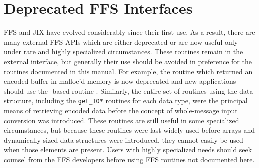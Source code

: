\section{Deprecated FFS Interfaces}
FFS and JIX have evolved considerably since their first use.  As a result,
there are many external FFS APIs which are either deprecated or are now
useful only under rare and highly specialized circumstances.  These routines
remain in the external interface, but generally their use should be avoided
in preference for the routines documented in this manual.  For example, the
routine  which returned an
encoded buffer in malloc'd memory is now deprecated and new applications
should use the -based routine
.  Similarly, the entire set of routines
using the  data structure, including the {\tt get\_IO*}
routines for each data type, were the principal means of retrieving encoded
data before the concept of whole-message input conversion was introduced.
These routines are still useful in some specialized circumstances, but
because these routines were last widely used before arrays and
dynamically-sized data structures were introduced, they cannot easily be
used when those elements are present.  Users with highly specialized needs
should seek counsel from the FFS developers before using FFS routines
not documented here.

%
%
\printindex


